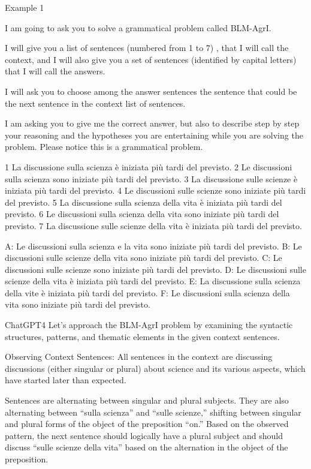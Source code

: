 Example 1

I am going to ask you to solve a grammatical problem called BLM-AgrI.  

I will give you a list of sentences (numbered from 1 to 7) , that I will call the context, and I will also give you a set of sentences (identified by capital letters) that I will call  the answers. 

I will ask you to choose among the answer sentences the sentence that could be the next sentence in the context list of sentences.

I am asking you to give me the correct answer, but also to describe step by step  your reasoning and the hypotheses you are entertaining while you are solving the problem. Please notice this is a grammatical problem.

1 La discussione sulla scienza è iniziata più tardi del previsto.
2 Le discussioni sulla scienza sono iniziate più tardi del previsto.
3 La discussione sulle scienze è iniziata più tardi del previsto.
4 Le discussioni sulle scienze sono iniziate più tardi del previsto.
5 La discussione sulla scienza della vita è iniziata più tardi del previsto.
6 Le discussioni sulla scienza della vita sono iniziate più tardi del previsto.
7 La discussione sulle scienze della vita è iniziata più tardi del previsto.

A: Le discussioni sulla scienza e la vita sono iniziate più tardi del previsto.
B: Le discussioni sulle scienze della vita sono iniziate più tardi del previsto.
C: Le discussioni sulle scienze sono iniziate più tardi del previsto.
D: Le discussioni sulle scienze della vita  è iniziata più tardi del previsto.
E: La discussione sulla scienza della vite è iniziata più tardi del previsto.
F: Le discussioni sulla scienza della vita sono iniziate più tardi del previsto.

ChatGPT4
Let’s approach the BLM-AgrI problem by examining the syntactic structures, patterns, and thematic elements in the given context sentences.

Observing Context Sentences:
All sentences in the context are discussing discussions (either singular or plural) about science and its various aspects, which have started later than expected.

Sentences are alternating between singular and plural subjects.
They are also alternating between “sulla scienza” and “sulle scienze,” shifting between singular and plural forms of the object of the preposition “on.”
Based on the observed pattern, the next sentence should logically have a plural subject and should discuss “sulle scienze della vita” based on the alternation in the object of the preposition.

